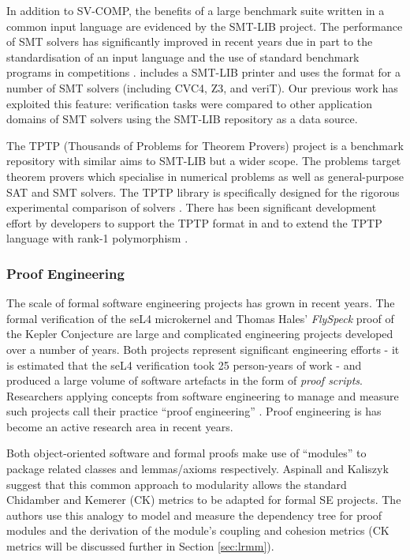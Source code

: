 In addition to SV-COMP, the benefits of a large benchmark suite written in a common input language are evidenced by the SMT-LIB \cite{SMTLIB} project. The performance of SMT solvers has significantly improved in recent years due in part to the standardisation of an input language and the use of standard benchmark programs in competitions \cite{SMTEVAL2013}. \why includes a SMT-LIB printer and uses the format for a number of SMT solvers (including CVC4, Z3, and veriT). Our previous work \cite{Healy:2016} has exploited this feature: verification tasks were compared to other application domains of SMT solvers using the SMT-LIB repository as a data source.

The TPTP (Thousands of Problems for Theorem Provers) project \cite{TPTP} is a benchmark repository with similar aims to SMT-LIB but a wider scope. The problems target theorem provers which specialise in numerical problems as well as general-purpose SAT and SMT solvers. The TPTP library is specifically designed for the rigorous experimental comparison of solvers \cite{Sutcliffe200139}. There has been significant development effort by \why developers to support the TPTP format in \why and to extend the TPTP language with rank-1 polymorphism \cite{why:tptp}. 

\subsubsection{Proof Engineering}
\label{sub:lrsvmmpe}

The scale of formal software engineering projects has grown in recent years. The formal verification of the seL4 microkernel \cite{Klein:2014:CFV} and Thomas Hales' \textit{FlySpeck} proof of the Kepler Conjecture \cite{hales-kepler} are large and complicated engineering projects developed over a number of years. Both projects represent significant engineering efforts - it is estimated that the seL4 verification took 25 person-years of work - and produced a large volume of software artefacts in the form of \textit{proof scripts}. Researchers applying concepts from software engineering to manage and measure such projects call their practice ``proof engineering'' \cite{Klein2014}. Proof engineering is has become an active research area in recent years. 

Both object-oriented software and formal proofs make use of ``modules'' to package related classes and lemmas/axioms respectively. Aspinall and Kaliszyk \cite{Aspinall2016} suggest that this common approach to modularity allows the standard Chidamber and Kemerer \cite{CandK} (CK) metrics to be adapted for formal SE projects. The authors use this analogy to model and measure the dependency tree for proof modules and the derivation of the module's coupling and cohesion metrics (CK metrics will be discussed further in Section \ref{sec:lrmm}).

